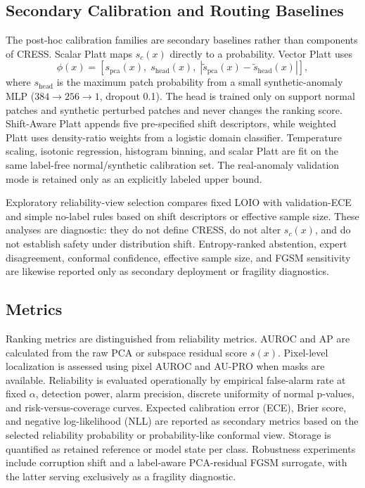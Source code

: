 \subsection{Secondary Calibration and Routing Baselines}
The post-hoc calibration families are secondary baselines rather than components of CRESS. Scalar Platt maps $s_c(x)$ directly to a probability. Vector Platt uses
\begin{equation}\label{eq:phi}
    \phi(x)=\left[s_{\mathrm{pca}}(x),\;s_{\mathrm{head}}(x),\;
    \left|\widetilde{s}_{\mathrm{pca}}(x)-\widetilde{s}_{\mathrm{head}}(x)\right|\right],
\end{equation}
where $s_{\mathrm{head}}$ is the maximum patch probability from a small synthetic-anomaly MLP ($384\!\to\!256\!\to\!1$, dropout 0.1). The head is trained only on support normal patches and synthetic perturbed patches and never changes the ranking score. Shift-Aware Platt appends five pre-specified shift descriptors, while weighted Platt uses density-ratio weights from a logistic domain classifier. Temperature scaling, isotonic regression, histogram binning, and scalar Platt are fit on the same label-free normal/synthetic calibration set. The real-anomaly validation mode is retained only as an explicitly labeled upper bound.

Exploratory reliability-view selection compares fixed LOIO with validation-ECE and simple no-label rules based on shift descriptors or effective sample size. These analyses are diagnostic: they do not define CRESS, do not alter $s_c(x)$, and do not establish safety under distribution shift. Entropy-ranked abstention, expert disagreement, conformal confidence, effective sample size, and FGSM sensitivity are likewise reported only as secondary deployment or fragility diagnostics.

\subsection{Metrics}
Ranking metrics are distinguished from reliability metrics. AUROC and AP are calculated from the raw PCA or subspace residual score $s(x)$. Pixel-level localization is assessed using pixel AUROC and AU-PRO when masks are available. Reliability is evaluated operationally by empirical false-alarm rate at fixed $\alpha$, detection power, alarm precision, discrete uniformity of normal p-values, and risk-versus-coverage curves. Expected calibration error (ECE), Brier score, and negative log-likelihood (NLL) are reported as secondary metrics based on the selected reliability probability or probability-like conformal view. Storage is quantified as retained reference or model state per class. Robustness experiments include corruption shift and a label-aware PCA-residual FGSM surrogate, with the latter serving exclusively as a fragility diagnostic.

